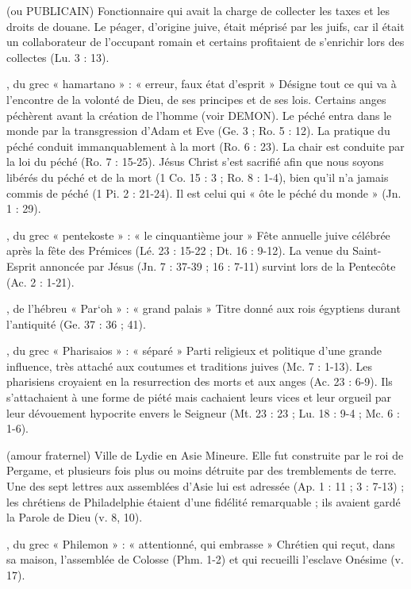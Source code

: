 \begin{multicols}{2}


(ou PUBLICAIN)
Fonctionnaire qui avait la charge de collecter les taxes et les droits de douane. Le péager, d'origine juive, était méprisé par les juifs, car il était un collaborateur de l'occupant romain et certains profitaient de s'enrichir lors des collectes (Lu. 3 : 13).


, du grec « hamartano » : « erreur, faux état d'esprit »
Désigne tout ce qui va à l'encontre de la volonté de Dieu, de ses principes et de ses lois. Certains anges péchèrent avant la création de l'homme (voir DEMON). Le péché entra dans le monde par la transgression d'Adam et Eve (Ge. 3 ; Ro. 5 : 12). La pratique du péché conduit immanquablement à la mort (Ro. 6 : 23). La chair est conduite par la loi du péché (Ro. 7 : 15-25).
Jésus Christ s'est sacrifié afin que nous soyons libérés du péché et de la mort (1 Co. 15 : 3 ; Ro. 8 : 1-4), bien qu'il n'a jamais commis de péché (1 Pi. 2 : 21-24). Il est celui qui « ôte le péché du monde » (Jn. 1 : 29).


, du grec « pentekoste » : « le cinquantième jour »
Fête annuelle juive célébrée après la fête des Prémices (Lé. 23 : 15-22 ; Dt. 16 : 9-12). La venue du Saint-Esprit annoncée par Jésus (Jn. 7 : 37-39 ; 16 : 7-11) survint lors de la Pentecôte (Ac. 2 : 1-21).


, de l'hébreu « Par`oh » : « grand palais »
Titre donné aux rois égyptiens durant l'antiquité (Ge. 37 : 36 ; 41).


, du grec « Pharisaios » : « séparé »
Parti religieux et politique d'une grande influence, très attaché aux coutumes et traditions juives (Mc. 7 : 1-13). Les pharisiens croyaient en la resurrection des morts et aux anges (Ac. 23 : 6-9). Ils s'attachaient à une forme de piété mais cachaient leurs vices et leur orgueil par leur dévouement hypocrite envers le Seigneur (Mt. 23 : 23 ; Lu. 18 : 9-4 ; Mc. 6 : 1-6).


(amour fraternel)
Ville de Lydie en Asie Mineure. Elle fut construite par le roi de Pergame, et plusieurs fois plus ou moins détruite par des tremblements de terre. Une des sept lettres aux assemblées d'Asie lui est adressée (Ap. 1 : 11 ; 3 : 7-13) ; les chrétiens de Philadelphie étaient d'une fidélité remarquable ; ils avaient gardé la Parole de Dieu (v. 8, 10).


, du grec « Philemon » : « attentionné, qui embrasse »
Chrétien qui reçut, dans sa maison, l'assemblée de Colosse (Phm. 1-2) et qui recueilli l'esclave Onésime (v. 17).



\end{multicols}
